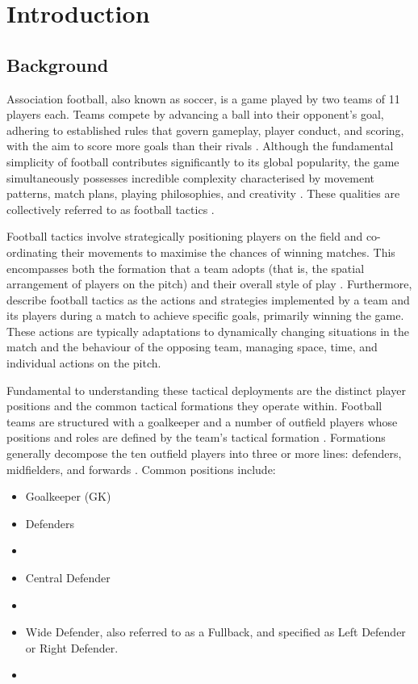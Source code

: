 
\chapter{Introduction}

\section{Background}

Association football, also known as soccer, is a game played by two teams of 11 players each. Teams compete by advancing a ball into their opponent's goal, adhering to established rules that govern gameplay, player conduct, and scoring, with the aim to score more goals than their rivals \citep{memmert_data_2018, sumpter_soccermatics_2016}. Although the fundamental simplicity of football contributes significantly to its global popularity, the game simultaneously possesses incredible complexity characterised by movement patterns, match plans, playing philosophies, and creativity \citep{bornn_soccer_2018, vicente_why_2024}. These qualities are collectively referred to as football tactics \citep{memmert_data_2018}.

Football tactics involve strategically positioning players on the field and co-ordinating their movements to maximise the chances of winning matches. This encompasses both the formation that a team adopts (that is, the spatial arrangement of players on the pitch) and their overall style of play \citep{wilson_inverting_2010}. Furthermore, \citet{rein_big_2016} describe football tactics as the actions and strategies implemented by a team and its players during a match to achieve specific goals, primarily winning the game. These actions are typically adaptations to dynamically changing situations in the match and the behaviour of the opposing team, managing space, time, and individual actions on the pitch.

Fundamental to understanding these tactical deployments are the distinct player positions and the common tactical formations they operate within. Football teams are structured with a goalkeeper and a number of outfield players whose positions and roles are defined by the team's tactical formation \citep{ma_analysis_2020, forcher_success_2023}. Formations generally decompose the ten outfield players into three or more lines: defenders, midfielders, and forwards \citep{ma_analysis_2020, forcher_success_2023}. Common positions include:
\begin{itemize}
    \item Goalkeeper (GK)
    \item Defenders
    \item \item Central Defender 
    \item \item Wide Defender, also referred to as a Fullback, and specified as Left Defender or Right Defender.
    \item 
\end{itemize}

